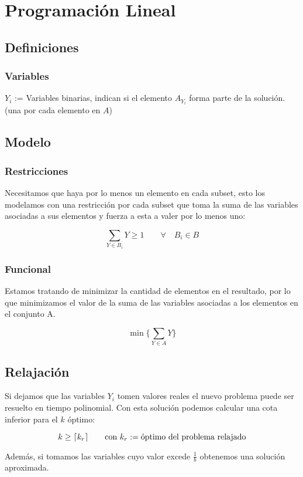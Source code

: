 \section{Programaci\'on Lineal}

\subsection{Definiciones}

\subsubsection{Variables}

\begin{center}
    $Y_i$ := Variables binarias, indican si el elemento $A_{Y_i}$ forma parte
    de la soluci\'on. \\ (una por cada elemento en $A$)
\end{center}

\subsection{Modelo}

\subsubsection{Restricciones}

Necesitamos que haya por lo menos un elemento en cada subset, esto los
modelamos con una restricci\'on por cada subset que toma la suma de las
variables asociadas a sus elementos y fuerza a esta a valer por lo menos uno:

\begin{equation}
    \sum_{Y \in B_i} Y \ge 1 \qquad \forall \quad B_i \in B
\end{equation}

\subsubsection{Funcional}

Estamos tratando de minimizar la cantidad de elementos en el resultado, por lo
que minimizamos el valor de la suma de las variables asociadas a los elementos
en el conjunto A.

\begin{equation}
    \min \{ \sum_{Y \in A} Y \}
\end{equation}

\subsection{Relajaci\'on}

Si dejamos que las variables $Y_i$ tomen valores reales el nuevo problema puede
ser resuelto en tiempo polinomial. Con esta soluci\'on podemos calcular una
cota inferior para el $k$ \'optimo:

\begin{equation}
    k \ge \lceil k_r\rceil \qquad \text{con} \ k_r := \text{\'optimo del problema
    relajado}
\end{equation}

Adem\'as, si tomamos las variables cuyo valor excede $\frac{1}{b}$ obtenemos
una soluci\'on aproximada.
